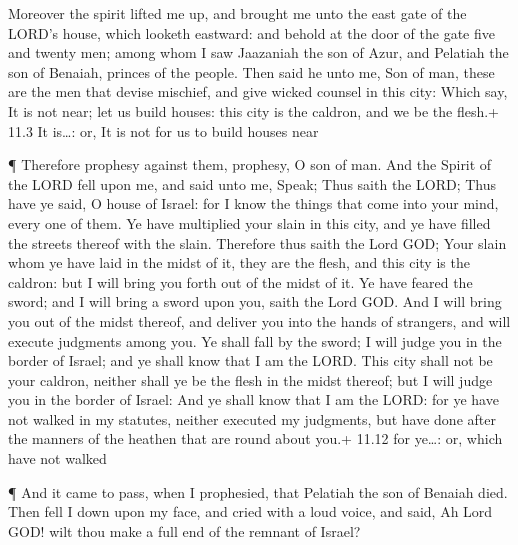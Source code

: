  Moreover the spirit lifted me up, and brought me unto the
east gate of the LORD's house, which looketh eastward: and behold at the
door of the gate five and twenty men; among whom I saw Jaazaniah the son
of Azur, and Pelatiah the son of Benaiah, princes of the people.
 Then said he unto me, Son of man, these are the men that
devise mischief, and give wicked counsel in this city: 
Which say, It is not near; let us build houses: this city is the
caldron, and we be the flesh.+ 11.3 It is\ldots: or, It is not for us to
build houses near

 ¶ Therefore prophesy against them, prophesy, O son of man.
 And the Spirit of the LORD fell upon me, and said unto me,
Speak; Thus saith the LORD; Thus have ye said, O house of Israel: for I
know the things that come into your mind, every one of them.
 Ye have multiplied your slain in this city, and ye have
filled the streets thereof with the slain.  Therefore thus
saith the Lord GOD; Your slain whom ye have laid in the midst of it,
they are the flesh, and this city is the caldron: but I will bring you
forth out of the midst of it.  Ye have feared the sword; and
I will bring a sword upon you, saith the Lord GOD.  And I
will bring you out of the midst thereof, and deliver you into the hands
of strangers, and will execute judgments among you.  Ye
shall fall by the sword; I will judge you in the border of Israel; and
ye shall know that I am the LORD.  This city shall not be
your caldron, neither shall ye be the flesh in the midst thereof; but I
will judge you in the border of Israel:  And ye shall know
that I am the LORD: for ye have not walked in my statutes, neither
executed my judgments, but have done after the manners of the heathen
that are round about you.+ 11.12 for ye\ldots: or, which have not walked

 ¶ And it came to pass, when I prophesied, that Pelatiah
the son of Benaiah died. Then fell I down upon my face, and cried with a
loud voice, and said, Ah Lord GOD! wilt thou make a full end of the
remnant of Israel?


